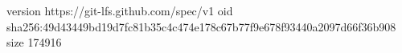 version https://git-lfs.github.com/spec/v1
oid sha256:49d43449bd19d7fc81b35c4c474e178c67b77f9e678f93440a2097d66f36b908
size 174916
